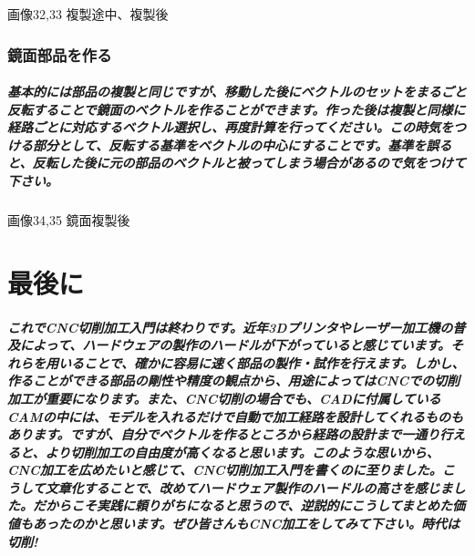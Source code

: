 \documentclass[b5paper, 9pt, twocolumn, titlepage,openany]{jsbook}%
\begin{document}
画像32,33 複製途中、複製後

\subsection{鏡面部品を作る}
\paragraph{基本的には部品の複製と同じですが、移動した後にベクトルのセットをまるごと反転することで鏡面のベクトルを作ることができます。作った後は複製と同様に経路ごとに対応するベクトル選択し、再度計算を行ってください。この時気をつける部分として、反転する基準をベクトルの中心にすることです。基準を誤ると、反転した後に元の部品のベクトルと被ってしまう場合があるので気をつけて下さい。}

画像34,35 鏡面複製後

\chapter{最後に}
\paragraph{これでCNC切削加工入門は終わりです。近年3Dプリンタやレーザー加工機の普及によって、ハードウェアの製作のハードルが下がっていると感じています。それらを用いることで、確かに容易に速く部品の製作・試作を行えます。しかし、作ることができる部品の剛性や精度の観点から、用途によってはCNCでの切削加工が重要になります。また、CNC切削の場合でも、CADに付属しているCAMの中には、モデルを入れるだけで自動で加工経路を設計してくれるものもあります。ですが、自分でベクトルを作るところから経路の設計まで一通り行えると、より切削加工の自由度が高くなると思います。このような思いから、CNC加工を広めたいと感じて、CNC切削加工入門を書くのに至りました。こうして文章化することで、改めてハードウェア製作のハードルの高さを感じました。だからこそ実践に頼りがちになると思うので、逆説的にこうしてまとめた価値もあったのかと思います。ぜひ皆さんもCNC加工をしてみて下さい。時代は切削!}



\end{document}
